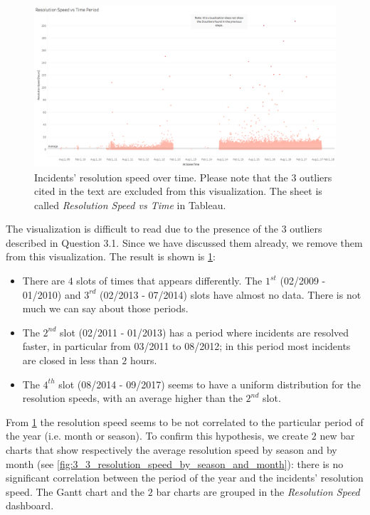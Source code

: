\begin{figure}[h]
	\centering
	\includegraphics[width=\columnwidth]{figures/3_3_resolution_speed_vs_time}
	\caption{Incidents' resolution speed over time. Please note that the $3$ outliers cited in the text are excluded from this visualization. The sheet is called \textit{Resolution Speed vs Time} in Tableau.}
	\label{fig:3_3_resolution_speed_vs_time}
\end{figure}

The visualization is difficult to read due to the presence of the $3$ outliers described in Question 3.1.
Since we have discussed them already, we remove them from this visualization.
The result is shown is \cref{fig:3_3_resolution_speed_vs_time}:
\begin{itemize}
    \item There are $4$ slots of times that appears differently. The $1^{st}$ (02/2009 - 01/2010) and $3^{rd}$ (02/2013 - 07/2014) slots have almost no data. There is not much we can say about those periods.
    \item The $2^{nd}$ slot (02/2011 - 01/2013) has a period where incidents are resolved faster, in particular from 03/2011 to 08/2012; in this period most incidents are closed in less than $2$ hours.
    \item The $4^{th}$ slot (08/2014 - 09/2017) seems to have a uniform distribution for the resolution speeds, with an average higher than the $2^{nd}$ slot.
\end{itemize}

From \cref{fig:3_3_resolution_speed_vs_time} the resolution speed seems to be not correlated to the particular period of the year (i.e. month or season).
To confirm this hypothesis, we create $2$ new bar charts that show respectively the average resolution speed by season and by month (see \cref{fig:3_3_resolution_speed_by_season_and_month}):
there is no significant correlation between the period of the year and the incidents' resolution speed.
The Gantt chart and the $2$ bar charts are grouped in the \textit{Resolution Speed} dashboard.

